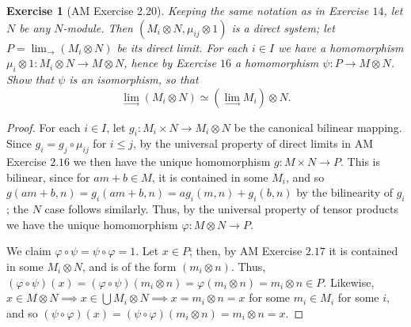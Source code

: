 \documentclass[12pt,letterpaper]{article}
\newtheorem{problem}{Exercise}[section]
\theoremstyle{definition}
\theoremstyle{remark}
\numberwithin{figure}{problem}
\numberwithin{equation}{section}
\begin{document}
\begin{problem}[AM Exercise 2.20]\label{exc:2.20}
  Keeping the same notation as in Exercise
  $14$, let
  $N$ be any
  $N$-module.
  Then
  $(M_i \otimes N, \mu_{ij} \otimes
  1)$ is a direct system; let
  $P = \displaystyle\lim_{\longrightarrow}(M_i \otimes
  N)$ be its direct limit.
  For each
  $i \in
  I$ we have a homomorphism
  $\mu_i \otimes 1 : M_i \otimes N \to M \otimes
  N$, hence by Exercise
  $16$ a homomorphism
  $\psi : P \to M \otimes
  N$.
  Show that
  $\psi$ is an isomorphism, so that
  \begin{equation*}
    \lim_{\longrightarrow} (M_i \otimes N) \simeq \left( \lim_{\longrightarrow} M_i \right) \otimes N.
  \end{equation*}
\end{problem}
\begin{proof}
  For each
  $i \in
  I$, let
  $g_i : M_i \times N \to M_i \otimes
  N$ be the canonical bilinear mapping.
  Since
  $g_i = g_j \circ
  \mu_{ij}$ for
  $i \le
  j$, by the universal property of direct limits in AM Exercise
  $2.16$ we then have the unique homomorphism
  $g : M \times N \to
  P$.
  This is bilinear, since for
  $am+b \in
  M$, it is contained in some
  $M_i$, and so
  $g(am+b,n) = g_i(am+b,n) = ag_i(m,n) +
  g_i(b,n)$ by the bilinearity of
  $g_i$; the
  $N$ case follows similarly.
  Thus, by the universal property of tensor products we have the unique homomorphism
  $\varphi : M \otimes N \to
  P$.
  \par We claim
  $\varphi \circ \psi = \psi \circ \varphi =
  1$.
  Let
  $x \in
  P$; then, by AM Exercise
  $2.17$ it is contained in some
  $M_i \otimes
  N$, and is of the form
  $(m_i \otimes
  n)$.
  Thus,
  $(\varphi \circ \psi)(x) = (\varphi \circ \psi)(m_i \otimes n) = \varphi(m_i \otimes n) = m_i \otimes n \in
  P$.
  Likewise,
  $x \in M \otimes N \implies x \in \bigcup M_i \otimes N \implies x = m_i \otimes n =
  x$ for some
  $m_i \in
  M_i$ for some
  $i$, and so
  $(\psi \circ \varphi)(x) = (\psi \circ \varphi)(m_i \otimes n) = m_i \otimes n =
  x$.
\end{proof}
\end{document}
